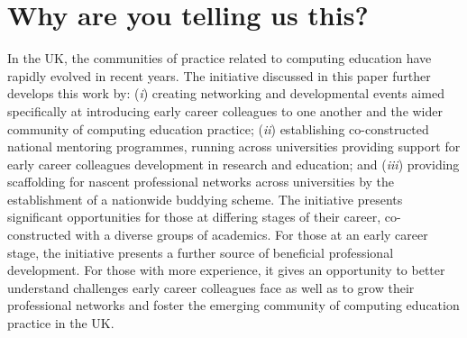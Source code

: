 \documentclass[sigconf]{acmart}
\begin{document}
\section{Why are you telling us this?}
In the UK, the communities of practice related to computing education
have rapidly evolved in recent years. The initiative discussed in this
paper further develops this work by: ({\emph{i}}) creating networking
and developmental events aimed specifically at introducing early
career colleagues to one another and the wider community of computing
education practice; ({\emph{ii}}) establishing co-constructed national
mentoring programmes, running across universities providing support
for early career colleagues development in research and education; and
({\emph{iii}}) providing scaffolding for nascent professional networks
across universities by the establishment of a nationwide buddying
scheme. The initiative presents significant opportunities for those at
differing stages of their career, co-constructed with a diverse groups
of academics.  For those at an early career stage, the initiative
presents a further source of beneficial professional development. For
those with more experience, it gives an opportunity to better
understand challenges early career colleagues face as well as to grow
their professional networks and foster the emerging community of
computing education practice in the UK.

	
	
	




\end{document}
